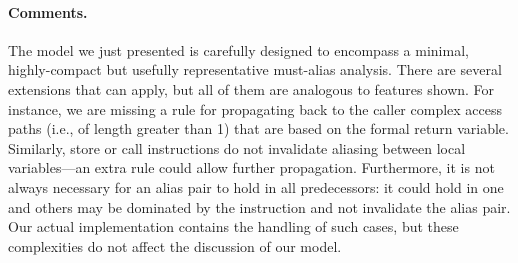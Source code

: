 \paragraph{Comments.}
The model we just presented is carefully designed to encompass a
minimal, highly-compact but usefully representative must-alias
analysis. There are several extensions that can apply, but all of them
are analogous to features shown. For instance, we are missing a rule
for propagating back to the caller complex access paths (i.e., of
length greater than 1) that are based on the formal return variable.
Similarly, store or call instructions do not invalidate aliasing
between local variables---an extra rule could allow further
propagation. Furthermore, it is not always necessary for an alias pair
to hold in all predecessors: it could hold in one and others may be
dominated by the instruction and not invalidate the alias pair. Our
actual implementation contains the handling of such cases, but these
complexities do not affect the discussion of our model.








